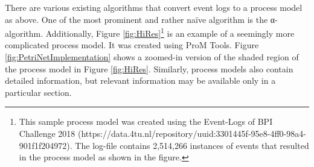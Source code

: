 There are various existing algorithms that convert event logs to a process model as above. One of the most prominent and rather naïve algorithm is the α-algorithm\cite{VanderAalst2011a}. Additionally, Figure \ref{fig:HiRes}\footnote{This sample process model was created using the Event-Logs of BPI Challenge 2018 (https://data.4tu.nl/repository/uuid:3301445f-95e8-4ff0-98a4-901f1f204972). The log-file contains 2,514,266 instances of events that resulted in the process model as shown in the figure.}  is an example of a seemingly more complicated process model. It was created using ProM Tools. Figure \ref{fig:PetriNetImplementation} shows a zoomed-in version of the shaded region of the process model in Figure \ref{fig:HiRes}. Similarly, process models also contain detailed information, but relevant information may be available only in a particular section. 
